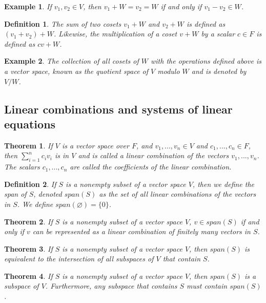 \documentclass[a4paper]{article}
\newtheorem{mytheorem}{Theorem}
\newtheorem{example}{Example}
\newtheorem{mydef}{Definition}
\numberwithin{mytheorem}{section}
\numberwithin{mydef}{section}
\numberwithin{example}{section}
\begin{document}
\begin{example} If $v_{1},v_{2} \in V$, then $v_{1} + W = v_{2} = W$ if and only if $v_{1} - v_{2} \in W$.
\end{example}

\begin{mydef} The sum of two cosets $v_{1} + W$ and $v_{2} + W$ is defined as $(v_{1} + v_{2}) + W$. Likewise, the multiplication of a coset $v + W$ by a scalar $c \in F$ is defined as $cv + W$.
\end{mydef}

\begin{example} The collection of all cosets of $W$ with the operations defined above is a vector space, known as the quotient space of $V$ modulo $W$ and is denoted by $V/W$.
\end{example}

\subsection{Linear combinations and systems of linear equations}

\begin{mytheorem} If $V$ is a vector space over $F$, and $v_{1},...,v_{n} \in V$ and $c_{1},...,c_{n} \in F$, then $\sum^{n}_{i = 1}c_{i}v_{i}$ is in $V$ and is called a linear combination of the vectors $v_{1},...,v_{n}$. The scalars $c_{1},...,c_{n}$ are called the coefficients of the linear combination.
\end{mytheorem}

\begin{mydef} If $S$ is a nonempty subset of a vector space $V$, then we define the span of $S$, denoted $span(S)$ as the set of all linear combinations of the vectors in $S$. We define $span(\varnothing) = \{ 0 \}$.
\end{mydef}

\begin{mytheorem} If $S$ is a nonempty subset of a vector space $V$, $v \in span(S)$ if and only if $v$ can be represented as a linear combination of finitely many vectors in $S$.
\end{mytheorem}

\begin{mytheorem} If $S$ is a nonempty subset of a vector space $V$, then $span(S)$ is equivalent to the intersection of all subspaces of $V$ that contain $S$.
\end{mytheorem}

\begin{mytheorem} If $S$ is a nonempty subset of a vector space $V$, then $span(S)$ is a subspace of $V$. Furthermore, any subspace that contains $S$ must contain $span(S)$.
\end{mytheorem}
\end{document}

